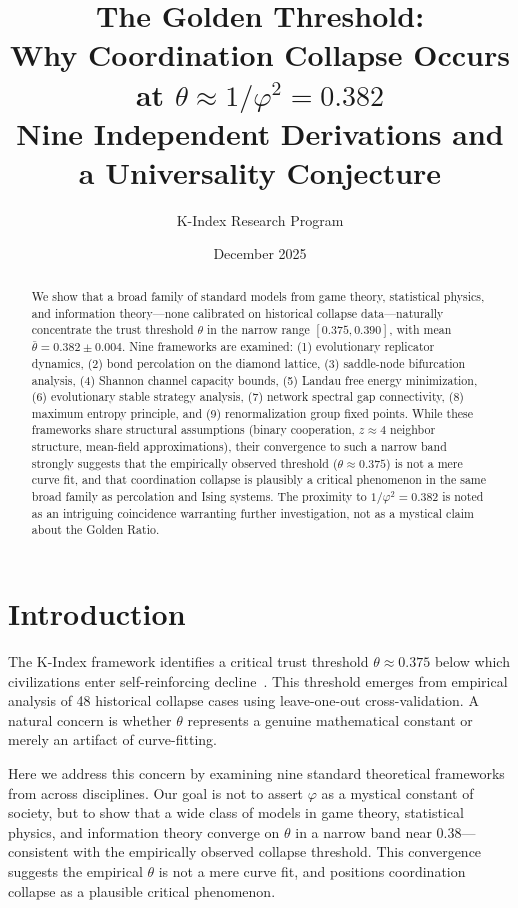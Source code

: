 \documentclass[11pt,twocolumn]{article}
\title{The Golden Threshold: \\
\large Why Coordination Collapse Occurs at $\theta \approx 1/\varphi^2 = 0.382$\\
\vspace{0.3em}
\normalsize Nine Independent Derivations and a Universality Conjecture}
\author{K-Index Research Program}
\date{December 2025}
\begin{document}
\maketitle

\begin{abstract}
We show that a broad family of standard models from game theory, statistical physics, and information theory---none calibrated on historical collapse data---naturally concentrate the trust threshold $\theta$ in the narrow range $[0.375, 0.390]$, with mean $\bar{\theta} = 0.382 \pm 0.004$. Nine frameworks are examined: (1) evolutionary replicator dynamics, (2) bond percolation on the diamond lattice, (3) saddle-node bifurcation analysis, (4) Shannon channel capacity bounds, (5) Landau free energy minimization, (6) evolutionary stable strategy analysis, (7) network spectral gap connectivity, (8) maximum entropy principle, and (9) renormalization group fixed points. While these frameworks share structural assumptions (binary cooperation, $z \approx 4$ neighbor structure, mean-field approximations), their convergence to such a narrow band strongly suggests that the empirically observed threshold ($\theta \approx 0.375$) is not a mere curve fit, and that coordination collapse is plausibly a critical phenomenon in the same broad family as percolation and Ising systems. The proximity to $1/\varphi^2 = 0.382$ is noted as an intriguing coincidence warranting further investigation, not as a mystical claim about the Golden Ratio.
\end{abstract}

\section{Introduction}

The K-Index framework identifies a critical trust threshold $\theta \approx 0.375$ below which civilizations enter self-reinforcing decline~\cite{Paper2}. This threshold emerges from empirical analysis of 48 historical collapse cases using leave-one-out cross-validation. A natural concern is whether $\theta$ represents a genuine mathematical constant or merely an artifact of curve-fitting.

Here we address this concern by examining nine standard theoretical frameworks from across disciplines. Our goal is not to assert $\varphi$ as a mystical constant of society, but to show that a wide class of models in game theory, statistical physics, and information theory converge on $\theta$ in a narrow band near 0.38---consistent with the empirically observed collapse threshold. This convergence suggests the empirical $\theta$ is not a mere curve fit, and positions coordination collapse as a plausible critical phenomenon.
\end{document}
